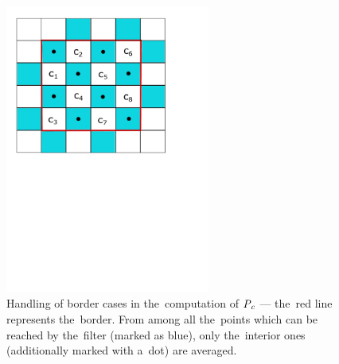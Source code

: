 \begin{figure}
	\includegraphics[trim={1cm 14cm 2cm 0}, clip, width=0.6\textwidth]{figures/cborders.pdf}\centering
	\caption{Handling of border cases in the~computation of $\mathit{P_{c}}$ --- the~red line represents the~border. From among all the~points which can be reached by the~filter (marked as blue), only the~interior ones (additionally marked with a~dot) are averaged.}
	\label{fig:cborders}
\end{figure}

